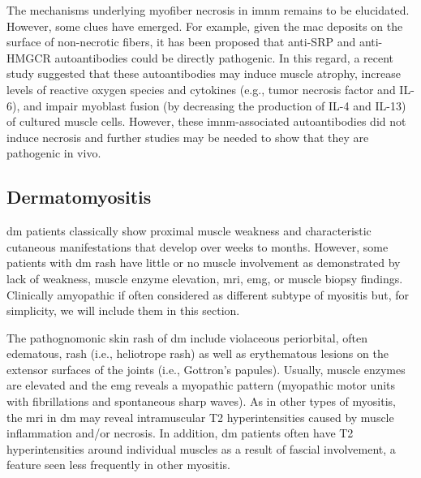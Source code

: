 The mechanisms underlying myofiber necrosis in \gls{imnm} remains to be elucidated. However, some clues have emerged. For example, given the \gls{mac} deposits on the surface of non-necrotic fibers, it has been proposed that anti-SRP and anti-HMGCR autoantibodies could be directly pathogenic.\cite{Allenbach2018} In this regard, a recent study suggested that these autoantibodies may induce muscle atrophy, increase levels of reactive oxygen species and cytokines (e.g., tumor necrosis factor and IL-6), and impair myoblast fusion (by decreasing the production of IL-4 and IL-13) of cultured muscle cells.\cite{AroucheDelaperche2017} However, these \gls{imnm}-associated autoantibodies did not induce necrosis and further studies may be needed to show that they are pathogenic in vivo.\cite{AroucheDelaperche2017}

\subsection{Dermatomyositis}

\gls{dm} patients classically show proximal muscle weakness and characteristic cutaneous manifestations that develop over weeks to months. However, some patients with \gls{dm} rash have little or no muscle involvement as demonstrated by lack of weakness, muscle enzyme elevation, \gls{mri}, \gls{emg}, or muscle biopsy findings. Clinically amyopathic if often considered as different subtype of myositis\cite{Sontheimer2002} but, for simplicity, we will include them in this section.

The pathognomonic skin rash of \gls{dm} include violaceous periorbital, often edematous, rash (i.e., heliotrope rash) as well as erythematous lesions on the extensor surfaces of the joints (i.e., Gottron’s papules). Usually, muscle enzymes are elevated and the \gls{emg} reveals a myopathic pattern (myopathic motor units with fibrillations and spontaneous sharp waves). As in other types of myositis, the \gls{mri} in \gls{dm} may reveal intramuscular T2 hyperintensities caused by muscle inflammation and/or necrosis.\cite{PinalFernandez2017} In addition, \gls{dm} patients often have T2 hyperintensities around individual muscles as a result of fascial involvement, a feature seen less frequently in other myositis.\cite{PinalFernandez2017} 

